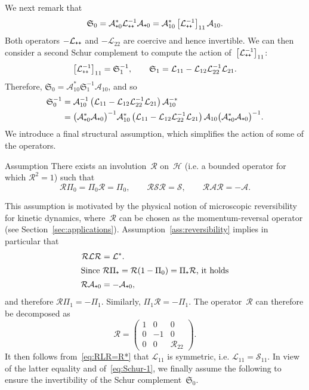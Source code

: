 \documentclass[AHL,Unicode,longabstracts,MathTools,published]{cedram}
\newcommand{\cL}{\mathcal{L}}
\newcommand{\cLs}{\mathcal{S}}
\newcommand{\cLa}{\mathcal{A}}
\newcommand{\cR}{\mathcal{R}}
\newcommand{\cH}{\mathcal{H}}
\newcommand{\Schur}{\mathfrak{S}_0}
\newcommand{\Schurb}{\mathfrak{S}_1}
\newcommand{\subplus}{\textnormal{\texttt{+}}}
\begin{document}
We next remark that
\begin{equation}\label{eq:Schur_L++11}
\Schur = \cLa_{\subplus0}^{*} \cL_{\subplus\subplus}^{-1} \cLa_{\subplus0} = \cLa_{10}^{*} \left[\cL_{\subplus\subplus}^{-1}\right]_{11} \cLa_{10}.
\end{equation}
Both operators $-\cL_{\subplus\subplus}$ and $-\cL_{22}$ are coercive and hence invertible. We can then consider a second Schur complement to compute the action of~$\left[\cL_{\subplus\subplus}^{-1}\right]_{11}$:
\[
\left[\cL_{\subplus\subplus}^{-1}\right]_{11} = \Schurb^{-1}, \qquad \Schurb = \cL_{11} - \cL_{12} \cL_{22}^{-1} \cL_{21}.
\]
Therefore, $\Schur = \cLa_{10}^{*} \Schurb^{-1}\cLa_{10}$, and so
\begin{equation}
\begin{aligned}\label{eq:Schur-1}
\Schur^{-1} & = \cLa_{10}^{-1}\left(\cL_{11} - \cL_{12} \cL_{22}^{-1} \cL_{21} \right)\cLa_{10}^{-*} \\
& = \big(\cLa_{\subplus0}^*\cLa_{\subplus0}\big)^{-1} \cLa_{10}^* \left(\cL_{11} - \cL_{12} \cL_{22}^{-1} \cL_{21} \right) \cLa_{10} \big(\cLa_{\subplus0}^*\cLa_{\subplus0}\big)^{-1}.
\end{aligned}
\end{equation}
We introduce a final structural assumption, which simplifies the action of some of the operators.

\begin{enonce}{Assumption}\label{ass:reversibility}
There exists an involution~$\cR$ on~$\cH$ (i.e. a bounded operator for which $\cR^2 = 1$) such that
\[
\cR \Pi_{0} = \Pi_{0} \cR = \Pi_{0}, \qquad \cR \cLs\cR = \cLs, \qquad \cR \cLa \cR = - \cLa.
\]
\end{enonce}

This assumption is motivated by the physical notion of microscopic reversibi\-lity for kinetic dynamics, where~$\cR$ can be chosen as the momentum-reversal operator (see Section~\ref{sec:applications}). Assumption~\ref{ass:reversibility} implies in particular that
\begin{align}
\cR \cL \cR &= \cL^*.\label{eq:RLR=R*}
\\
\intertext{Since $\cR\Pi_\subplus = \cR(1-\Pi_0) = \Pi_\subplus \cR$, it holds}
\cR \cLa_{\subplus0} &= -\cLa_{\subplus0},\label{eq:R_A+0}
\end{align}
and therefore $\cR \Pi_{1} = -\Pi_{1}$. Similarly, $\Pi_{1} \cR = -\Pi_{1}$. The operator~$\cR$ can therefore be decomposed as
\[
\cR =
\begin{pmatrix}
1&0&0\\
0&-1&0\\
0&0&\cR_{22}
\end{pmatrix}.
\]
It then follows from~\eqref{eq:RLR=R*} that $\cL_{11}$ is symmetric,
i.e. $\cL_{11} = \cLs_{11}$. In view of the latter equality and of~\eqref{eq:Schur-1}, we finally assume the following to ensure the invertibility of the Schur complement~$\Schur$.
\end{document}

